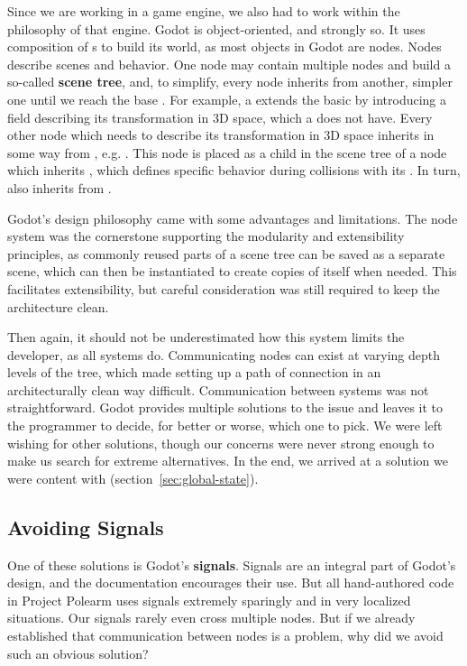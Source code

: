 \documentclass[../Main.tex]{subfiles}
\begin{document}
Since we are working in a game engine, we also had to work within the philosophy of that engine. Godot is object-oriented, and strongly so. It uses composition of s to build its world, as most objects in Godot are nodes. Nodes describe scenes and behavior. One node may contain multiple nodes and build a so-called \textbf{scene tree}, and, to simplify, every node inherits from another, simpler one until we reach the base . For example, a  extends the basic  by introducing a field describing its transformation in 3D space, which a  does not have. Every other node which needs to describe its transformation in 3D space inherits in some way from , e.g. . This node is placed as a child in the scene tree of a node which inherits , which defines specific behavior during collisions with its . In turn,  also inherits from .

Godot's design philosophy came with some advantages and limitations. The node system was the cornerstone supporting the modularity and extensibility principles, as commonly reused parts of a scene tree can be saved as a separate scene, which can then be instantiated to create copies of itself when needed. This facilitates extensibility, but careful consideration was still required to keep the architecture clean.

Then again, it should not be underestimated how this system limits the developer, as all systems do. Communicating nodes can exist at varying depth levels of the tree, which made setting up a path of connection in an architecturally clean way difficult. Communication between systems was not straightforward. Godot provides multiple solutions to the issue and leaves it to the programmer to decide, for better or worse, which one to pick. We were left wishing for other solutions, though our concerns were never strong enough to make us search for extreme alternatives. In the end, we arrived at a solution we were content with (section~\ref{sec:global-state}).

\subsection{Avoiding Signals}\label{sec:avoiding-signals}

One of these solutions is Godot's \textbf{signals}. Signals are an integral part of Godot's design, and the documentation encourages their use\autocite[]{godot_signals}. But all hand-authored code in Project Polearm uses signals extremely sparingly and in very localized situations. Our signals rarely even cross multiple nodes. But if we already established that communication between nodes is a problem, why did we avoid such an obvious solution?
\end{document}
